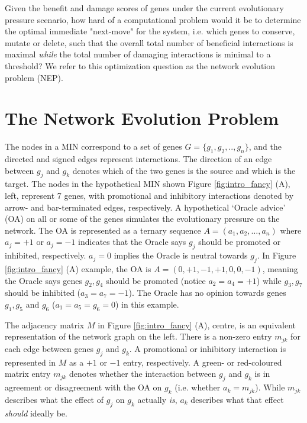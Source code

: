 \documentclass[12pt]{article}
\begin{document}
Given the benefit and damage scores of genes under the current evolutionary pressure scenario, how hard of a computational problem would it be to determine the optimal immediate "next-move" for the system, i.e. which genes to conserve, mutate or delete, such that the overall total number of beneficial interactions is maximal \textit{while} the total number of damaging interactions is minimal to a threshold? We refer to this optimization question as the network evolution problem (NEP).

\section{The Network Evolution Problem}
The nodes in a MIN correspond to a set of genes $G=\{g_1,g_2,..,g_n\}$, and the directed and signed edges represent interactions. The direction of an edge between $g_j$ and $g_k$ denotes which of the two genes is the source and which is the target. The nodes in the hypothetical MIN shown Figure \ref{fig:intro_fancy} (A), left,  represent 7  genes, with promotional and inhibitory interactions denoted by arrow- and bar-terminated edges, respectively. A hypothetical `Oracle advice' (OA) on all or some of the genes simulates the evolutionary pressure on the network. The OA is represented as a ternary sequence $A = (a_1,a_2,\dots,a_n)$ where $a_j=+1$ or $a_j=-1$ indicates that the Oracle says $g_j$ should be promoted or inhibited, respectively. $a_j=0$ implies the Oracle is neutral towards $g_j$. In Figure \ref{fig:intro_fancy} (A) example, the OA is $A=(0,+1,-1,+1,0,0,-1)$, meaning the Oracle says genes $g_2,g_4$ should be promoted (notice $a_2=a_4=+1$) while $g_3,g_7$ should be inhibited ($a_3=a_7=-1$). The Oracle has no opinion towards genes $g_1,g_5$ and $g_6$ ($a_1=a_5=g_6=0$) in this example.

The adjacency matrix $M$ in Figure \ref{fig:intro_fancy} (A), centre, is an equivalent representation of the network graph on the left. There is a non-zero entry $m_{jk}$ for each edge between genes $g_j$ and $g_k$. A promotional or inhibitory interaction is represented in $M$ as a $+1$ or $-1$ entry, respectively.  A green- or red-coloured matrix entry $m_{jk}$ denotes whether the interaction between $g_j$ and $g_k$ is in agreement or disagreement with the OA on $g_k$ (i.e. whether $a_k=m_{jk}$). While $m_{jk}$ describes what the effect of $g_j$ on $g_k$ actually \textit{is}, $a_k$ describes what that effect \textit{should} ideally be.
\end{document}
